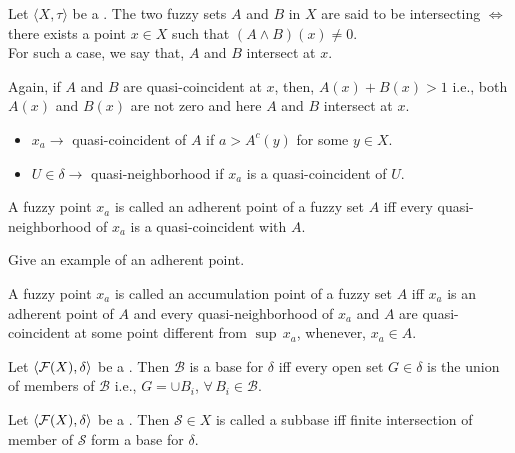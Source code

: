 \documentclass[../main-sheet.tex]{subfiles}
\begin{document}
\begin{rem}
    Let \(\langle X,\tau\rangle\) be a \fts. The two fuzzy sets \(A \) and \(B \) in \(X \) are said to be intersecting \(\Leftrightarrow\) there exists a point \(x\in X \) such that \((A\wedge B)(x)\neq 0\).\\
    For such a case, we say that, \(A \) and \(B \) intersect at \(x \).

    Again, if \(A \) and \(B \) are quasi-coincident at \(x \), then, \(A(x)+B(x)>1\) i.e., both \(A(x )\) and \(B(x )\) are not zero and here \(A \) and \(B \) intersect at \(x \).
    

    \begin{itemize}
        \item \(x_a\to\) quasi-coincident of \(A \) if \(a>A^c(y )\) for some \(y\in X \).
        \item \(U\in\delta\to  \) quasi-neighborhood if \(x_a \) is a quasi-coincident of \(U \).
    \end{itemize}
\end{rem}
\begin{defn}
    A fuzzy point \(x_a \) is called an adherent point of a fuzzy set \(A \) iff every quasi-neighborhood of \(x_a \) is a quasi-coincident with \(A \).
\end{defn}
\begin{prob}
    Give an example of an adherent point.
\end{prob}
\begin{defn}
    A fuzzy point \(x_a \) is called an accumulation point of a fuzzy set \(A \) iff \(x_a \) is an adherent point of \(A \) and every quasi-neighborhood of \(x_a \) and \(A \) are quasi-coincident at some point different from \(\sup\,x_a \), whenever, \(x_a\in A \).
\end{defn}
\begin{defn}[Base]
    Let \(\langle \mathcal{F}(X), \delta \rangle\) be a \fts. Then \(\mathcal{B }\) is a base for \(\delta\) iff every open set \(G\in\delta\) is the union of members of \(\mathcal{B }\) i.e., \(G=\cup B_i \), \(\forall\,B_i\in\mathcal{B }\).
\end{defn}
\begin{defn}[Subbase]
    Let \(\langle \mathcal{F}(X), \delta \rangle \) be a \fts. Then \(\mathcal{S}\in X \) is called a subbase iff finite intersection of member of \(\mathcal{S }\) form a base for  \(\delta\).
\end{defn}
\end{document}

